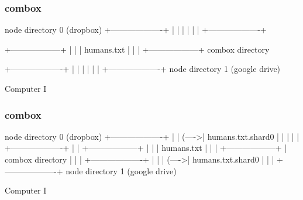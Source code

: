 \begin{frame}[fragile]
  \frametitle{combox}

  {\tiny
  \begin{semiverbatim}

         node directory 0
         (dropbox)
        +-------------------+
        |                   |
        |                   |
        |                   |
        +-------------------+


 +------------------+
 |                  |
 |  humans.txt      |
 |                  |
 +------------------+
     combox directory


        +-------------------+
        |                   |
        |                   |
        |                   |
        +-------------------+
         node directory 1
         (google drive)

  Computer I
  \end{semiverbatim}
  }

\end{frame}


\begin{frame}[fragile]
  \frametitle{combox}

  {\tiny
  \begin{semiverbatim}

         node directory 0
         (dropbox)
        +-------------------+
        |                   |
  (---->| humans.txt.shard0 |
  |     |                   |
  |     +-------------------+
  |
  |
 +------------------+
 |                  |
 |  humans.txt      |
 |                  |
 +------------------+
  |  combox directory
  |
  |
  |     +-------------------+
  |     |                   |
  (---->| humans.txt.shard0 |
        |                   |
        +-------------------+
         node directory 1
         (google drive)

  Computer I
  \end{semiverbatim}
  }

\end{frame}


